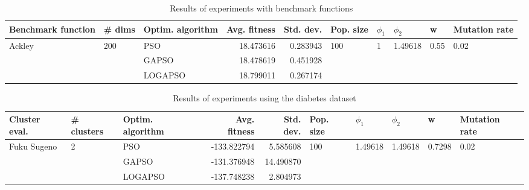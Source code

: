 \documentclass{article}
\begin{document}
\begin{table}
\centering
\caption{Results of experiments with benchmark functions}
\begin{tabular}{lllrrlllll}
\toprule
     Benchmark function &              \# dims & Optim. algorithm &  Avg. fitness &  Std. dev. &            Pop. size &         $\phi_{1}$ &               $\phi_{2}$ &                     w &         Mutation rate \\
\midrule
\multirow{3}{*}{Ackley} & \multirow{3}{*}{200} &              PSO &     18.473616 &   0.283943 & \multirow{3}{*}{100} & \multirow{3}{*}{1} & \multirow{3}{*}{1.49618} & \multirow{3}{*}{0.55} & \multirow{3}{*}{0.02} \\
                        &                      &            GAPSO &     18.478619 &   0.451928 &                      &                    &                          &                       &                       \\
                        &                      &          LOGAPSO &     18.799011 &   0.267174 &                      &                    &                          &                       &                       \\
\bottomrule
\end{tabular}
\end{table}
\begin{table}
\centering
\caption{Results of experiments using the diabetes dataset}
\begin{tabular}{lllrrlllll}
\toprule
               Cluster eval. &        \# clusters & Optim. algorithm &  Avg. fitness &  Std. dev. &            Pop. size &               $\phi_{1}$ &               $\phi_{2}$ &                       w &         Mutation rate \\
\midrule
\multirow{3}{*}{Fuku Sugeno} & \multirow{3}{*}{2} &              PSO &   -133.822794 &   5.585608 & \multirow{3}{*}{100} & \multirow{3}{*}{1.49618} & \multirow{3}{*}{1.49618} & \multirow{3}{*}{0.7298} & \multirow{3}{*}{0.02} \\
                             &                    &            GAPSO &   -131.376948 &  14.490870 &                      &                          &                          &                         &                       \\
                             &                    &          LOGAPSO &   -137.748238 &   2.804973 &                      &                          &                          &                         &                       \\
\bottomrule
\end{tabular}
\end{table}
\end{document}
